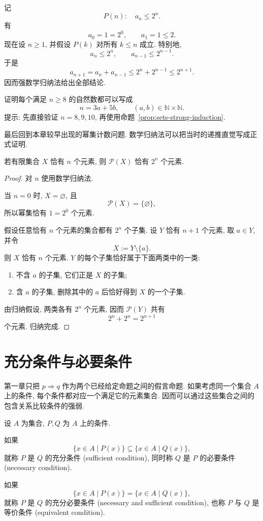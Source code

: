 \documentclass[usesamecnt, thmcnt=section, lang=cn, newtx, 10pt, scheme=chinese]{elegantbook}
\begin{document}
\begin{solution}
记
\[
 P(n):\quad a_n\leq2^n.
\]
有
\[
 a_0=1=2^0,\qquad a_1=1\leq2.
\]
现在设 $n\geq1$, 并假设 $P(k)$ 对所有 $k\leq n$ 成立. 特别地,
\[
 a_n\leq2^n,\qquad a_{n-1}\leq2^{n-1}.
\]
于是
\[
 a_{n+1}
 =a_n+a_{n-1}
 \leq2^n+2^{n-1}
 \leq2^{n+1}.
\]
因而强数学归纳法给出全部结论.
\end{solution}

\begin{exercise}\label{ex:sets-induction-strong}
证明每个满足 $n\geq8$ 的自然数都可以写成
\[
 n=3a+5b,
 \qquad (a,b)\in\mathbb N\times\mathbb N.
\]
提示: 先直接验证 $n=8,9,10$, 再使用命题~\ref{prop:sets-strong-induction}.
\end{exercise}

最后回到本章较早出现的幂集计数问题. 数学归纳法可以把当时的递推直觉写成正式证明.

\begin{proposition}\label{prop:sets-powerset-count}
若有限集合 $X$ 恰有 $n$ 个元素, 则 $\mathscr P(X)$ 恰有
$2^n$ 个元素.
\end{proposition}

\begin{proof}
对 $n$ 使用数学归纳法.

当 $n=0$ 时, $X=\varnothing$, 且
\[
 \mathscr P(X)=\{\varnothing\},
\]
所以幂集恰有 $1=2^0$ 个元素.

假设任意恰有 $n$ 个元素的集合都有 $2^n$ 个子集. 设 $Y$ 恰有 $n+1$ 个元素, 取 $a\in Y$, 并令
\[
 X:=Y\setminus\{a\}.
\]
则 $X$ 恰有 $n$ 个元素. $Y$ 的每个子集恰好属于下面两类中的一类:
\begin{enumerate}[label=\rm(\arabic*)]
  \item 不含 $a$ 的子集, 它们正是 $X$ 的子集;
  \item 含 $a$ 的子集, 删除其中的 $a$ 后恰好得到 $X$ 的一个子集.
\end{enumerate}
由归纳假设, 两类各有 $2^n$ 个元素, 因而
$
 \mathscr P(Y)
$
共有
\[
 2^n+2^n=2^{n+1}
\]
个元素. 归纳完成.
\end{proof}


\section{充分条件与必要条件}

第一章只把 $p\Rightarrow q$ 作为两个已经给定命题之间的假言命题. 如果考虑同一个集合 $A$ 上的条件, 每个条件都对应一个满足它的元素集合. 因而可以通过这些集合之间的包含关系比较条件的强弱.

\begin{definition}[充分条件与必要条件]\label{def:sets-sufficient-necessary}
设 $A$ 为集合, $P ,Q $ 为 $A$ 上的条件.

如果
\[
 \{x\in A\mid P(x)\}
 \subseteq
 \{x\in A\mid Q(x)\},
\]
就称 $P $ 是 $Q $ 的{\color{blue}充分条件 (sufficient condition)}, 同时称 $Q $ 是 $P $ 的{\color{blue}必要条件 (necessary condition)}.

如果
\[
 \{x\in A\mid P(x)\}
 =
 \{x\in A\mid Q(x)\},
\]
就称 $P $ 是 $Q $ 的{\color{blue}充分必要条件 (necessary and sufficient condition)}, 也称 $P $ 与 $Q $ 是{\color{blue}等价条件 (equivalent condition)}.
\end{definition}
\end{document}
